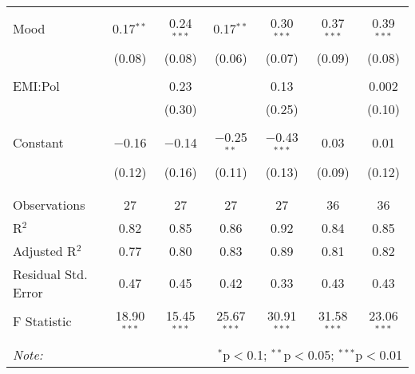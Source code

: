 \begin{table}[!htbp]
\begin{tabular}{@{\extracolsep{5pt}}lcccccc}
  & & & & & & \\ 
 Mood & 0.17$^{**}$ & 0.24$^{***}$ & 0.17$^{**}$ & 0.30$^{***}$ & 0.37$^{***}$ & 0.39$^{***}$ \\ 
  & (0.08) & (0.08) & (0.06) & (0.07) & (0.09) & (0.08) \\ 
  & & & & & & \\ 
 EMI:Pol &  & 0.23 &  & 0.13 &  & 0.002 \\ 
  &  & (0.30) &  & (0.25) &  & (0.10) \\ 
  & & & & & & \\ 
 Constant & $-$0.16 & $-$0.14 & $-$0.25$^{**}$ & $-$0.43$^{***}$ & 0.03 & 0.01 \\ 
  & (0.12) & (0.16) & (0.11) & (0.13) & (0.09) & (0.12) \\ 
  & & & & & & \\ 
\hline \\[-1.8ex] 
Observations & 27 & 27 & 27 & 27 & 36 & 36 \\ 
R$^{2}$ & 0.82 & 0.85 & 0.86 & 0.92 & 0.84 & 0.85 \\ 
Adjusted R$^{2}$ & 0.77 & 0.80 & 0.83 & 0.89 & 0.81 & 0.82 \\ 
Residual Std. Error & 0.47 & 0.45 & 0.42 & 0.33 & 0.43 & 0.43 \\ 
F Statistic & 18.90$^{***}$ & 15.45$^{***}$ & 25.67$^{***}$ & 30.91$^{***}$ & 31.58$^{***}$ & 23.06$^{***}$ \\ 
\hline 
\hline \\[-1.8ex] 
\textit{Note:}  & \multicolumn{6}{r}{$^{*}$p$<$0.1; $^{**}$p$<$0.05; $^{***}$p$<$0.01} \\ 
\end{tabular} 
\end{table} 

